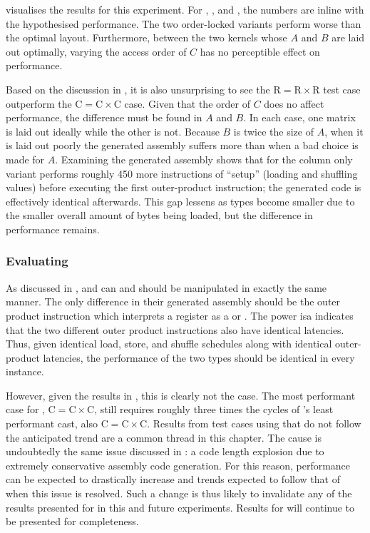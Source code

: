 \documentclass[\main/thesis.tex]{subfiles}
\begin{document}
 visualises the results for this experiment.
For , , and , the numbers are inline with the hypothesised performance.
The two order-locked variants perform worse than the optimal layout.
Furthermore, between the two kernels whose $A$ and $B$ are laid out optimally, varying the access order of $C$ has no perceptible effect on performance.

Based on the discussion in , it is also unsurprising to see the $\textrm{R} = \textrm{R} \times \textrm{R}$ test case outperform the $\textrm{C} = \textrm{C} \times \textrm{C}$ case.
Given that the order of $C$ does no affect performance, the difference must be found in $A$ and $B$.
In each case, one matrix is laid out ideally while the other is not.
Because $B$ is twice the size of $A$, when it is laid out poorly the generated assembly suffers more than when a bad choice is made for $A$.
Examining the generated assembly shows that for  the column only variant performs roughly 450 more instructions of ``setup'' (loading and shuffling values) before executing the first outer-product instruction; the generated code is effectively identical afterwards.
This gap lessens as types become smaller due to the smaller overall amount of bytes being loaded, but the difference in performance remains.

\subsubsection{Evaluating \texorpdfstring{}{half}}
As discussed in ,  and  can and should be manipulated in exactly the same manner.
The only difference in their generated assembly should be the outer product instruction which interprets a register as a  or .
The \gls{power} \gls{isa} indicates that the two different outer product instructions also have identical latencies.
Thus, given identical load, store, and shuffle schedules along with identical outer-product latencies, the performance of the two types should be identical in every instance.

However, given the results in , this is clearly not the case.
The most performant case for , $\textrm{C} = \textrm{C} \times \textrm{C}$, still requires roughly three times the cycles of 's least performant cast, also $\textrm{C} = \textrm{C} \times \textrm{C}$.
Results from test cases using  that do not follow the anticipated trend are a common thread in this chapter.
The cause is undoubtedly the same issue discussed in : a code length explosion due to extremely conservative assembly code generation.
For this reason, performance can be expected to drastically increase and trends expected to follow that of  when this issue is resolved.
Such a change is thus likely to invalidate any of the results presented for  in this and future experiments.
Results for  will continue to be presented for completeness.
\end{document}
